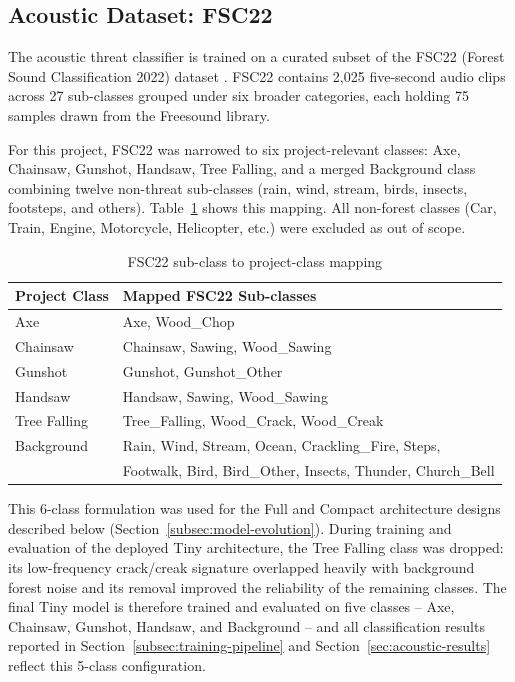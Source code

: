 \subsection{Acoustic Dataset: FSC22}

The acoustic threat classifier is trained on a curated subset of the FSC22
(Forest Sound Classification 2022) dataset \cite{kahl2023fsc22}. FSC22
contains 2,025 five-second audio clips across 27 sub-classes grouped under
six broader categories, each holding 75 samples drawn from the Freesound
library.

For this project, FSC22 was narrowed to six project-relevant classes: Axe,
Chainsaw, Gunshot, Handsaw, Tree Falling, and a merged Background class
combining twelve non-threat sub-classes (rain, wind, stream, birds, insects,
footsteps, and others). Table~\ref{tab:class-mapping} shows this mapping.
All non-forest classes (Car, Train, Engine, Motorcycle, Helicopter, etc.)
were excluded as out of scope.

\begin{table}[H]
    \centering
    \caption{FSC22 sub-class to project-class mapping}
    \label{tab:class-mapping}
    \begin{tabular}{ll}
        \toprule
        \textbf{Project Class} & \textbf{Mapped FSC22 Sub-classes} \\
        \midrule
        Axe & Axe, Wood\_Chop \\
        Chainsaw & Chainsaw, Sawing, Wood\_Sawing \\
        Gunshot & Gunshot, Gunshot\_Other \\
        Handsaw & Handsaw, Sawing, Wood\_Sawing \\
        Tree Falling & Tree\_Falling, Wood\_Crack, Wood\_Creak \\
        Background & Rain, Wind, Stream, Ocean, Crackling\_Fire, Steps, \\
                    & Footwalk, Bird, Bird\_Other, Insects, Thunder, Church\_Bell \\
        \bottomrule
    \end{tabular}
\end{table}

This 6-class formulation was used for the Full and Compact architecture
designs described below (Section~\ref{subsec:model-evolution}). During
training and evaluation of the deployed Tiny architecture, the Tree Falling
class was dropped: its low-frequency crack/creak signature overlapped
heavily with background forest noise and its removal improved the
reliability of the remaining classes. The final Tiny model is therefore
trained and evaluated on five classes -- Axe, Chainsaw, Gunshot, Handsaw,
and Background -- and all classification results reported in
Section~\ref{subsec:training-pipeline} and Section~\ref{sec:acoustic-results}
reflect this 5-class configuration.

